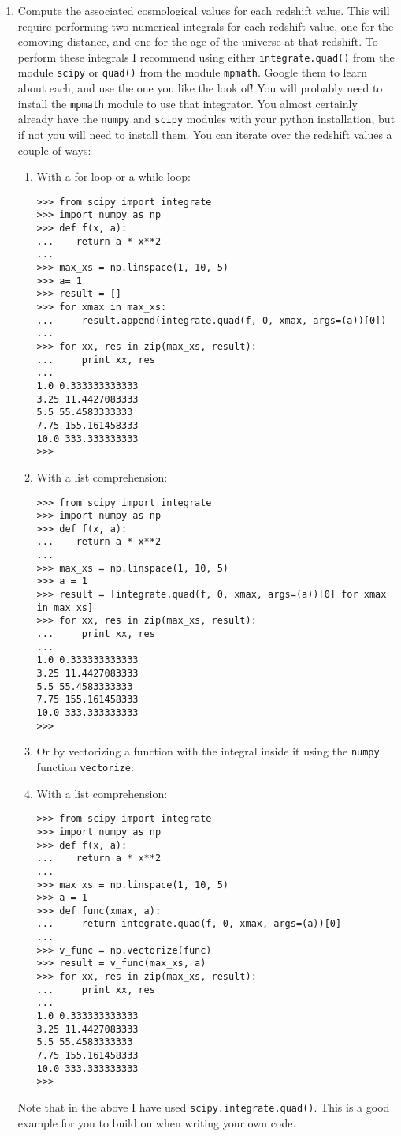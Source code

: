 \documentclass[]{article}
\begin{document}
\begin{enumerate}
\item Compute the associated cosmological values for each redshift value. This will require performing two numerical integrals for each redshift value, one for the comoving distance, and one for the age of the universe at that redshift. To perform these integrals I recommend using either \texttt{integrate.quad()} from the module \texttt{scipy} or \texttt{quad()} from the module \texttt{mpmath}. Google them to learn about each, and use the one you like the look of! You will probably need to install the \texttt{mpmath} module to use that integrator. You almost certainly already have the \texttt{numpy} and \texttt{scipy} modules with your python installation, but if not you will need to install them. You can iterate over the redshift values a couple of ways:
\begin{enumerate}
\item With a for loop or a while loop:
\begin{lstlisting}
>>> from scipy import integrate
>>> import numpy as np
>>> def f(x, a):
...    return a * x**2
... 
>>> max_xs = np.linspace(1, 10, 5)
>>> a= 1
>>> result = []
>>> for xmax in max_xs:
...     result.append(integrate.quad(f, 0, xmax, args=(a))[0])
...
>>> for xx, res in zip(max_xs, result):
...     print xx, res
... 
1.0 0.333333333333
3.25 11.4427083333
5.5 55.4583333333
7.75 155.161458333
10.0 333.333333333
>>> 
\end{lstlisting}

\item With a list comprehension:
\begin{lstlisting}
>>> from scipy import integrate
>>> import numpy as np
>>> def f(x, a):
...    return a * x**2
... 
>>> max_xs = np.linspace(1, 10, 5)
>>> a = 1
>>> result = [integrate.quad(f, 0, xmax, args=(a))[0] for xmax in max_xs]
>>> for xx, res in zip(max_xs, result):
...     print xx, res
... 
1.0 0.333333333333
3.25 11.4427083333
5.5 55.4583333333
7.75 155.161458333
10.0 333.333333333
>>> 
\end{lstlisting}

\item Or by vectorizing a function with the integral inside it using the \texttt{numpy} function \texttt{vectorize}:
\item With a list comprehension:
\begin{lstlisting}
>>> from scipy import integrate
>>> import numpy as np
>>> def f(x, a):
...    return a * x**2
... 
>>> max_xs = np.linspace(1, 10, 5)
>>> a = 1
>>> def func(xmax, a):
...     return integrate.quad(f, 0, xmax, args=(a))[0]
... 
>>> v_func = np.vectorize(func)
>>> result = v_func(max_xs, a)
>>> for xx, res in zip(max_xs, result):
...     print xx, res
... 
1.0 0.333333333333
3.25 11.4427083333
5.5 55.4583333333
7.75 155.161458333
10.0 333.333333333
>>> 
\end{lstlisting}
\end{enumerate} 
Note that in the above I have used \texttt{scipy.integrate.quad()}. This is a good example for you to build on when writing your own code. 


\end{enumerate}
\end{document}
